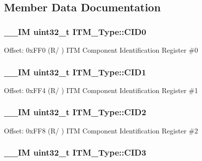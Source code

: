 \subsection{Member Data Documentation}
\hypertarget{struct_i_t_m___type_a30bb2b166b1723867da4a708935677ba}{
\subsubsection[{C\-I\-D0}]{\setlength{\rightskip}{0pt plus 5cm}\-\_\-\-\_\-\-I\-M uint32\-\_\-t I\-T\-M\-\_\-\-Type\-::\-C\-I\-D0}}\label{struct_i_t_m___type_a30bb2b166b1723867da4a708935677ba}
Offset\-: 0x\-F\-F0 (R/ ) I\-T\-M Component Identification Register \#0 \hypertarget{struct_i_t_m___type_ac40df2c3a6cef02f90b4e82c8204756f}{
\subsubsection[{C\-I\-D1}]{\setlength{\rightskip}{0pt plus 5cm}\-\_\-\-\_\-\-I\-M uint32\-\_\-t I\-T\-M\-\_\-\-Type\-::\-C\-I\-D1}}\label{struct_i_t_m___type_ac40df2c3a6cef02f90b4e82c8204756f}
Offset\-: 0x\-F\-F4 (R/ ) I\-T\-M Component Identification Register \#1 \hypertarget{struct_i_t_m___type_a8000b92e4e528ae7ac4cb8b8d9f6757d}{
\subsubsection[{C\-I\-D2}]{\setlength{\rightskip}{0pt plus 5cm}\-\_\-\-\_\-\-I\-M uint32\-\_\-t I\-T\-M\-\_\-\-Type\-::\-C\-I\-D2}}\label{struct_i_t_m___type_a8000b92e4e528ae7ac4cb8b8d9f6757d}
Offset\-: 0x\-F\-F8 (R/ ) I\-T\-M Component Identification Register \#2 \hypertarget{struct_i_t_m___type_a43451f43f514108d9eaed5b017f8d921}{
\subsubsection[{C\-I\-D3}]{\setlength{\rightskip}{0pt plus 5cm}\-\_\-\-\_\-\-I\-M uint32\-\_\-t I\-T\-M\-\_\-\-Type\-::\-C\-I\-D3}}\label{struct_i_t_m___type_a43451f43f514108d9eaed5b017f8d921}

